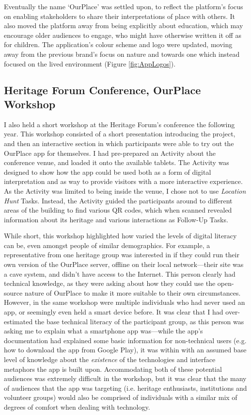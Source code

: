 Eventually the name `OurPlace' was settled upon, to reflect the platform's focus on enabling stakeholders to share their interpretations of place with others. It also moved the platform away from being explicitly about education, which may encourage older audiences to engage, who might have otherwise written it off as for children. The application's colour scheme and logo were updated, moving away from the previous brand's focus on nature and towards one which instead focused on the lived environment (Figure \ref{fig:AppLogos}).

\subsection{Heritage Forum Conference, OurPlace Workshop}
\label{sec:HeritageOurPlaceWorkshop}

I also held a short workshop at the Heritage Forum's conference the following year. This workshop consisted of a short presentation introducing the project, and then an interactive section in which participants were able to try out the OurPlace app for themselves. I had pre-prepared an Activity about the conference venue, and loaded it onto the available tablets. The Activity was designed to show how the app could be used both as a form of digital interpretation and as way to provide visitors with a more interactive experience. As the Activity was limited to being inside the venue, I chose not to use \textit{Location Hunt} Tasks. Instead, the Activity guided the participants around to different areas of the building to find various QR codes, which when scanned revealed information about its heritage and various interactions as Follow-Up Tasks.

While short, this workshop highlighted how varied the levels of digital literacy can be, even amongst people of similar demographics. For example, a representative from one heritage group was interested in if they could run their own version of the OurPlace server, offline on their local network---their site was a cave system, and didn't have access to the Internet. This person clearly had technical knowledge, as they were asking about how they could use the open-source nature of OurPlace to make it more suitable to their own circumstances. However, in the same workshop were multiple individuals who had never used an app, or seemingly even held a smart device before. It was clear that I had over-estimated the base technical literacy of the participant group, as this person was asking me to explain what a smartphone app was---while the app's documentation had explained some basic information for non-technical users (e.g. how to download the app from Google Play), it was within with an assumed base level of knowledge about the \textit{existence} of the technologies and interface metaphors the app is built upon. Accommodating both of these potential audiences was extremely difficult in the workshop, but it was clear that the many of audiences that the app was targeting (i.e. heritage enthusiasts, institutions and volunteer groups) would also be comprised of individuals with a similar mix of degrees of comfort when dealing with technology.

